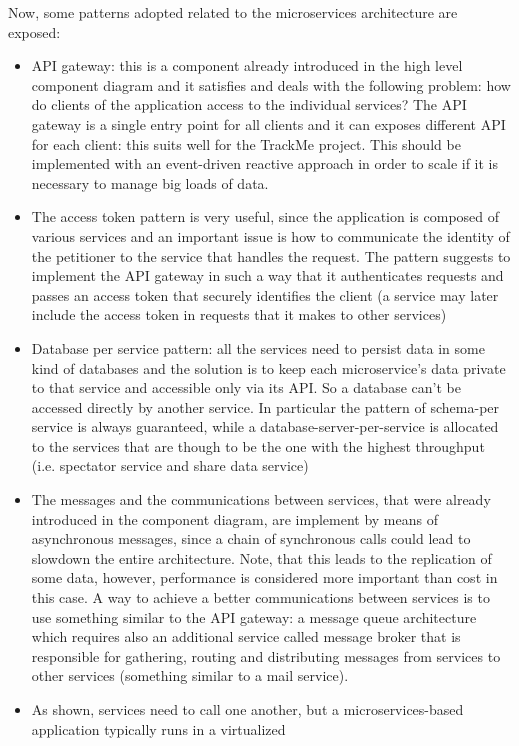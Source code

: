 Now, some patterns adopted related to the microservices architecture are exposed:
\begin{itemize}
\item API gateway: this is a component already introduced in the high level component diagram and it
satisfies and deals with the following problem: how do clients of the application access to the individual
services? The API gateway is a single entry point for all clients and it can exposes different API for
each client: this suits well for the TrackMe project. This should be implemented with an event-driven
reactive approach in order to scale if it is necessary to manage big loads of data. \\
\item The access token pattern is very useful, since the application is composed of various services and
an important issue is how to communicate the identity of the petitioner to the service that handles the
request. 
The pattern suggests to implement the API gateway in such
a way that it authenticates requests and passes an access token that securely identifies the client (a
service may later include the access token in requests that it makes to other services)
\item Database per service pattern: all the services need to persist data in some kind of databases and
the solution is to keep each microservice's data private to that service and accessible only via its API.
So a database can't be accessed directly by another service. In particular the pattern of schema-per
service is always guaranteed, while a database-server-per-service is allocated to the services that are
though to be the one with the highest throughput (i.e. spectator service and share data service)
\item The messages and the communications between services, that were already introduced in the component diagram, are implement by means of
asynchronous messages, since a chain of synchronous calls could lead to slowdown the entire architecture. Note, that this leads to the
replication of some data, however, performance is considered more important than cost in this case. A way to achieve a better communications between services is to use something similar to the API gateway: a message queue architecture which requires also an additional service called message broker that is responsible for gathering, routing and distributing messages from services to other services (something similar to a mail service).
\item As shown, services need to call one another, but a microservices-based application typically runs in a virtualized 

\end{itemize}
